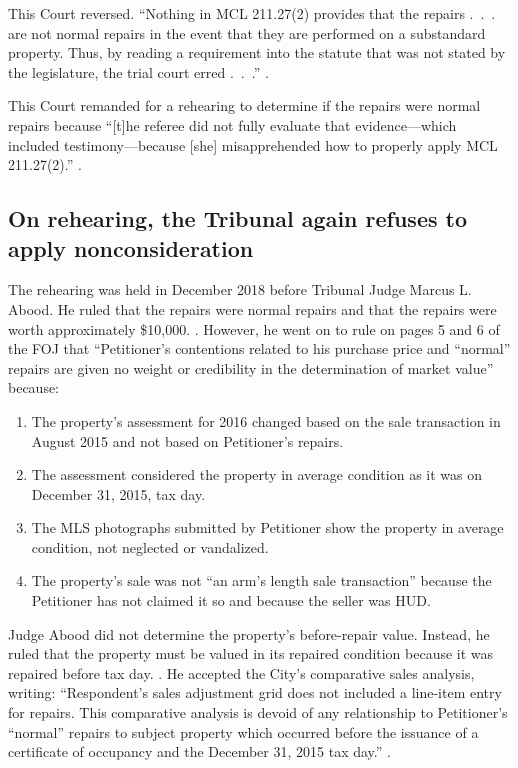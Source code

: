 \documentclass[12pt,\documentclassflag]{michiganCourtOfAppealsBrief}
\begin{document}
This Court reversed. ``Nothing in MCL 211.27(2) provides that the repairs .~.~. are not normal repairs in the event that they are performed on a substandard property. Thus, by reading a requirement into the statute that was not stated by the legislature, the trial court erred .~.~.'' .

This Court remanded for a rehearing to determine if the repairs were normal repairs because ``[t]he referee did not fully evaluate that evidence---which included testimony---because [she] misapprehended how to properly apply MCL 211.27(2).'' .

\subsection{On rehearing, the Tribunal again refuses to apply nonconsideration}

The rehearing was held in December 2018 before Tribunal Judge Marcus L. Abood. He ruled that the repairs were normal repairs and that the repairs were worth approximately \$10,000. \foj[4]. However, he went on to rule on pages 5 and 6 of the FOJ that ``Petitioner's contentions related to his purchase price and ``normal'' repairs are given no weight or credibility in the determination of market value'' because:
\begin{enumerate}
\item The property's assessment for 2016 changed based on the sale transaction in August 2015 and not based on Petitioner's repairs. 
\item The assessment considered the property in average condition as it was on December 31, 2015, tax day.
\item The MLS photographs submitted by Petitioner show the property in average condition, not neglected or vandalized.
\item The property's sale was not ``an arm's length sale transaction'' because the Petitioner has not claimed it so and because the seller was HUD.
\end{enumerate}

Judge Abood did not determine the property's before-repair value. Instead, he ruled that the property must be valued in its repaired condition because it was repaired before tax day. \foj[5]. He accepted the City's comparative sales analysis, writing: ``Respondent's sales adjustment grid does not included a line-item entry for repairs. This comparative analysis is devoid of any relationship to Petitioner's ``normal'' repairs to subject property which occurred before the issuance of a certificate of occupancy and the December 31, 2015 tax day.'' \foj[6].
\end{document}
